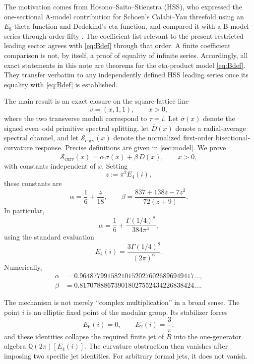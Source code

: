 \documentclass[11pt]{article}
\theoremstyle{definition}
\theoremstyle{remark}
\newcommand{\Q}{\mathbb{Q}}
\newcommand{\bsigma}{\overline{\sigma}}
\newcommand{\bD}{\overline{D}}
\newcommand{\bSc}{\overline{\mathcal{S}}_{\mathrm{curv}}}
\begin{document}
The motivation comes from Hosono--Saito--Stienstra (HSS), who expressed the one-sectional A-model contribution for Schoen's Calabi--Yau threefold using an \(E_8\) theta function and Dedekind's eta function, and compared it with a B-model series through order fifty \cite{HSS}. The coefficient list relevant to the present restricted leading sector agrees with \eqref{eq:Bdef} through that order. A finite coefficient comparison is not, by itself, a proof of equality of infinite series. Accordingly, all exact statements in this note are theorems for the eta-product model \eqref{eq:Bdef}. They transfer verbatim to any independently defined HSS leading series once its equality with \eqref{eq:Bdef} is established.

The main result is an exact closure on the square-lattice line
\[
 v=(x,1,1),\qquad x>0,
\]
where the two transverse moduli correspond to \(\tau=i\). Let \(\bsigma(x)\) denote the signed even--odd primitive spectral splitting, let \(\bD(x)\) denote a radial-average spectral channel, and let \(\bSc(x)\) denote the normalized first-order bisectional-curvature response. Precise definitions are given in \cref{sec:model}. We prove
\begin{equation}\label{eq:introclosure}
 \bSc(x)=\alpha\,\bsigma(x)+\beta\,\bD(x),
 \qquad x>0,
\end{equation}
with constants independent of \(x\). Setting
\begin{equation}\label{eq:zdef}
 z:=\pi^2E_4(i),
\end{equation}
these constants are
\begin{equation}\label{eq:abintro}
 \alpha=\frac16+\frac{z}{18},
 \qquad
 \beta=\frac{837+138z-7z^2}{72(z+9)}.
\end{equation}
In particular,
\begin{equation}\label{eq:alphagamma}
 \alpha
 =\frac16+\frac{\Gamma(1/4)^8}{384\pi^4},
\end{equation}
using the standard evaluation
\[
 E_4(i)=\frac{3\Gamma(1/4)^8}{(2\pi)^6}.
\]
Numerically,
\begin{align*}
 \alpha&=0.964877991582101520276026896949417\ldots,\\
 \beta&=0.817078886739018027552434226838424\ldots.
\end{align*}

The mechanism is not merely ``complex multiplication'' in a broad sense. The point \(i\) is an elliptic fixed point of the modular group. Its stabilizer forces
\[
 E_6(i)=0,
 \qquad
 E_2(i)=\frac{3}{\pi},
\]
and these identities collapse the required finite jet of \(B\) into the one-generator algebra \(\Q(2\pi)[E_4(i)]\). The curvature obstruction then vanishes after imposing two specific jet identities. For arbitrary formal jets, it does not vanish.
\end{document}
